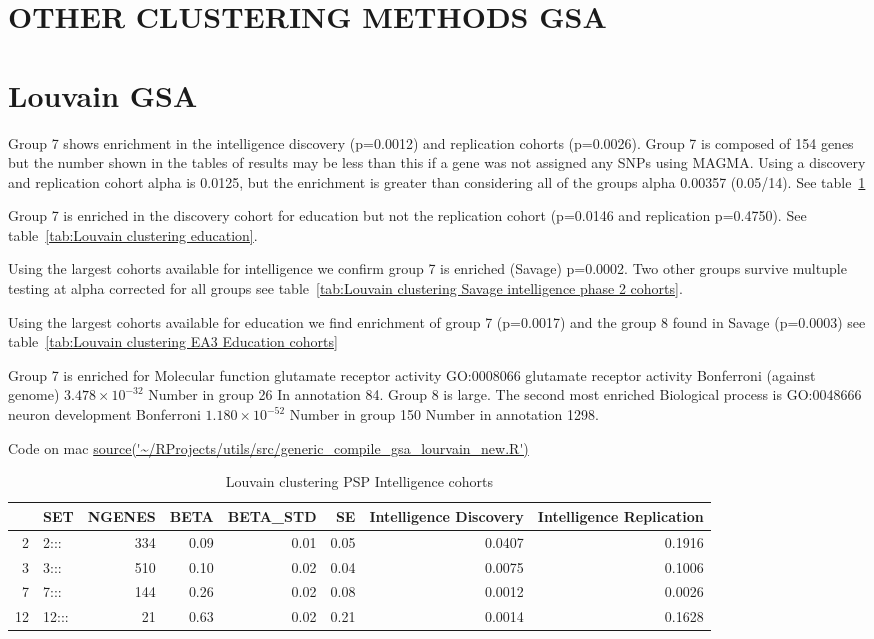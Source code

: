 \section{OTHER CLUSTERING METHODS GSA}

\section{Louvain GSA}
\label{Louvain GSA}
Group 7 shows enrichment in the intelligence discovery (p=0.0012) and replication cohorts (p=0.0026). Group 7 is composed of 154 genes but the number shown in the tables of results may be less than this if a gene was not assigned any SNPs using MAGMA. Using a discovery and replication cohort alpha is 0.0125, but the enrichment is greater than considering all of the groups alpha 0.00357 (0.05/14). See table~\ref{tab:Louvain clustering intelligence}

Group 7 is enriched in the discovery cohort for education but not the replication cohort (p=0.0146 and replication p=0.4750). See table~\ref{tab:Louvain clustering education}.

Using the largest cohorts available for intelligence we confirm group 7 is enriched (Savage) p=0.0002. Two other groups survive multuple testing at alpha corrected for all groups see table~\ref{tab:Louvain clustering Savage intelligence phase 2 cohorts}. 

Using the largest cohorts available for education we find enrichment of group 7 (p=0.0017) and the group 8 found in Savage (p=0.0003) see table~\ref{tab:Louvain clustering EA3 Education cohorts}

Group 7 is enriched for Molecular function glutamate receptor activity GO:0008066 	glutamate receptor activity 		 	Bonferroni (against genome) $3.478 \times 10^{-32}$ 	Number in group 26  In annotation	84. 
Group 8 is large. The second most enriched Biological process is GO:0048666 	neuron development 		Bonferroni	$1.180 \times 10^{-52}$ 	Number in group 150 	Number in annotation 1298.

Code on mac \url{source('~/RProjects/utils/src/generic_compile_gsa_lourvain_new.R')}
\begin{table}[ht]
\centering
\begin{tabular}{rlrrrrrr}
  \hline
 & SET & NGENES & BETA & BETA\_STD & SE & Intelligence Discovery & Intelligence Replication \\ 
  \hline
2 & 2::: & 334 & 0.09 & 0.01 & 0.05 & 0.0407 & 0.1916 \\ 
  3 & 3::: & 510 & 0.10 & 0.02 & 0.04 & 0.0075 & 0.1006 \\ 
  7 & 7::: & 144 & 0.26 & 0.02 & 0.08 & 0.0012 & 0.0026 \\ 
  12 & 12::: & 21 & 0.63 & 0.02 & 0.21 & 0.0014 & 0.1628 \\ 
   \hline
\end{tabular}
\caption{Louvain clustering PSP Intelligence cohorts}
\label{tab:Louvain clustering intelligence}
\end{table}

